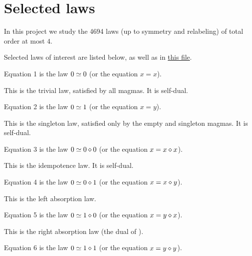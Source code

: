 \chapter{Selected laws}\label{subgraph-eq}

In this project we study the 4694 laws (up to symmetry and relabeling) of total order at most $4$.

Selected laws of interest are listed below, as well as in \href{https://github.com/teorth/equational_theories/blob/main/equational_theories/Equations/Basic.lean}{this file}.

\begin{definition}[Equation 1]\label{eq1}\leanok{}  Equation 1 is the law $0 \simeq 0$ (or the equation $x=x$).
\end{definition}

This is the trivial law, satisfied by all magmas. It is self-dual.


\begin{definition}[Equation 2]\label{eq2}\leanok{}  Equation 2 is the law $0 \simeq 1$ (or the equation $x=y$).
\end{definition}

This is the singleton law, satisfied only by the empty and singleton magmas.  It is self-dual.

\begin{definition}[Equation 3]\label{eq3}\leanok{}  Equation 3 is the law $0 \simeq 0 \diamond 0$ (or the equation $x = x \diamond x$).
\end{definition}

This is the idempotence law.  It is self-dual.

\begin{definition}[Equation 4]\label{eq4}\leanok{}  Equation 4 is the law $0 \simeq 0 \diamond 1$ (or the equation $x = x \diamond y$).
\end{definition}

This is the left absorption law.

\begin{definition}[Equation 5]\label{eq5}\leanok{}  Equation 5 is the law $0 \simeq 1 \diamond 0$ (or the equation $x = y \diamond x$).
\end{definition}

This is the right absorption law (the dual of ).

\begin{definition}[Equation 6]\label{eq6}\leanok{}  Equation 6 is the law $0 \simeq 1 \diamond 1$ (or the equation $x = y \diamond y$).
\end{definition}

